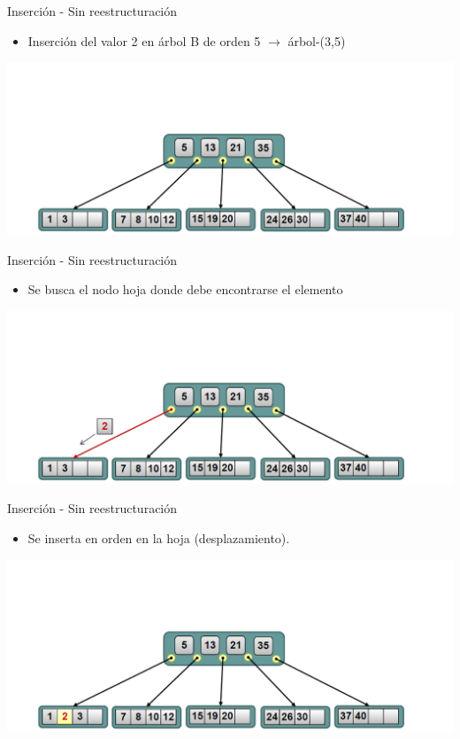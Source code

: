 \documentclass[handout]{beamer} %
\newcommand{\redb}[1]{{\color{red!70!black}{#1}}}
\begin{document}
\begin{frame}{Inserción - Sin reestructuración}
    \begin{itemize}
        \item Inserción del valor 2 en árbol B de orden 5 $\to$ árbol-(3,5)
    \end{itemize}
    \begin{center}
        \includegraphics[width=\textwidth]{./image/cap3/b-tree-insert1}
    \end{center}
\end{frame}

\begin{frame}{Inserción - Sin reestructuración}
    \begin{itemize}
        \item Se busca el nodo hoja donde debe encontrarse el elemento
    \end{itemize}
    \begin{center}
        \includegraphics[width=\textwidth]{./image/cap3/b-tree-insert2}
    \end{center}
\end{frame}

\begin{frame}{Inserción - Sin reestructuración}
    \begin{itemize}
        \item Se inserta en orden en la hoja (desplazamiento). \redb{Fin}
    \end{itemize}
    \begin{center}
        \includegraphics[width=\textwidth]{./image/cap3/b-tree-insert3}
    \end{center}
\end{frame}
\end{document}
